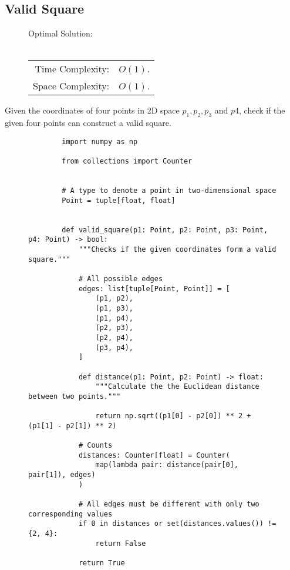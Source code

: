 
\subsection{Valid Square}

\begin{figure}[H]
    Optimal Solution:\\\\
    \begin{tabular}{rl}
        Time Complexity:& \(O(1)\).\\
        Space Complexity:& \(O(1)\).
    \end{tabular}
\end{figure}

Given the coordinates of four points in 2D space \(p_1, p_2, p_3\) and \(p4\),
check if the given four points can construct a valid square.

\begin{figure}[H]
    \centering
    \begin{verbatim}
        import numpy as np

        from collections import Counter


        # A type to denote a point in two-dimensional space
        Point = tuple[float, float]


        def valid_square(p1: Point, p2: Point, p3: Point, p4: Point) -> bool:
            """Checks if the given coordinates form a valid square."""

            # All possible edges
            edges: list[tuple[Point, Point]] = [
                (p1, p2),
                (p1, p3),
                (p1, p4),
                (p2, p3),
                (p2, p4),
                (p3, p4),
            ]

            def distance(p1: Point, p2: Point) -> float:
                """Calculate the the Euclidean distance between two points."""

                return np.sqrt((p1[0] - p2[0]) ** 2 + (p1[1] - p2[1]) ** 2)

            # Counts
            distances: Counter[float] = Counter(
                map(lambda pair: distance(pair[0], pair[1]), edges)
            )

            # All edges must be different with only two corresponding values
            if 0 in distances or set(distances.values()) != {2, 4}:
                return False

            return True
    \end{verbatim}
\end{figure}
